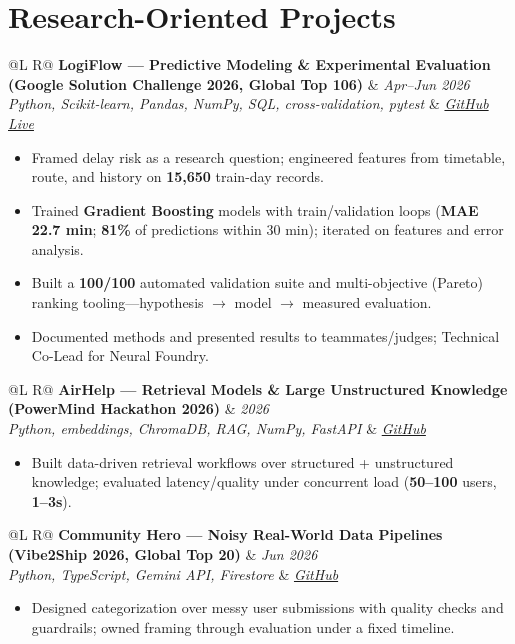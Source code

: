 \documentclass[a4paper,10pt]{article}
\makeatletter
\newcommand{\proj}[4]{%
  \vspace{1.2mm}
  \noindent\begin{tabularx}{\textwidth}{@{}L R@{}}
    \textbf{#1} & \textit{\small #2} \\
    \textit{\small #3} & \textit{\small #4} \\
  \end{tabularx}\par
  \vspace{0.4mm}%
}
\makeatother
\begin{document}
\section{Research-Oriented Projects}
\proj{LogiFlow --- Predictive Modeling \& Experimental Evaluation (Google Solution Challenge 2026, Global Top 106)}{Apr--Jun 2026}
{Python, Scikit-learn, Pandas, NumPy, SQL, cross-validation, pytest}
{\href{https://github.com/Ojas-Srivastava05/LogiFlow-Solution-Challenge-2026}{GitHub} \textbar{} \href{https://logi-flow-solution-challenge-2026.vercel.app}{Live}}
\begin{itemize}
  \item Framed delay risk as a research question; engineered features from timetable, route, and history on \textbf{15,650} train-day records.
  \item Trained \textbf{Gradient Boosting} models with train/validation loops (\textbf{MAE 22.7 min}; \textbf{81\%} of predictions within 30 min); iterated on features and error analysis.
  \item Built a \textbf{100/100} automated validation suite and multi-objective (Pareto) ranking tooling---hypothesis $\rightarrow$ model $\rightarrow$ measured evaluation.
  \item Documented methods and presented results to teammates/judges; Technical Co-Lead for Neural Foundry.
\end{itemize}

\proj{AirHelp --- Retrieval Models \& Large Unstructured Knowledge (PowerMind Hackathon 2026)}{2026}
{Python, embeddings, ChromaDB, RAG, NumPy, FastAPI}
{\href{https://github.com/Ojas-Srivastava05/AirHelp-AI-Airport-Assistant}{GitHub}}
\begin{itemize}
  \item Built data-driven retrieval workflows over structured + unstructured knowledge; evaluated latency/quality under concurrent load (\textbf{50--100} users, \textbf{1--3s}).
\end{itemize}

\proj{Community Hero --- Noisy Real-World Data Pipelines (Vibe2Ship 2026, Global Top 20)}{Jun 2026}
{Python, TypeScript, Gemini API, Firestore}
{\href{https://github.com/Ojas-Srivastava05/community-hero}{GitHub}}
\begin{itemize}
  \item Designed categorization over messy user submissions with quality checks and guardrails; owned framing through evaluation under a fixed timeline.
\end{itemize}
\end{document}
